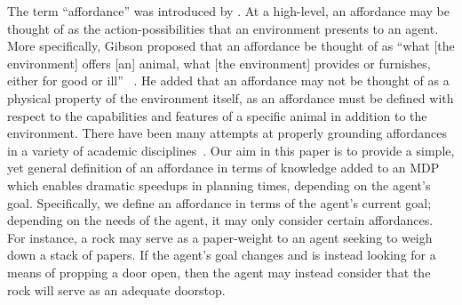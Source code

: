 \documentclass[]{article}
\begin{document}
The term ``affordance'' was introduced by \citet{gibson77}. At a
high-level, an affordance may be thought of as the
action-possibilities that an environment presents to an agent. More
specifically, Gibson proposed that an affordance be thought of as
``what [the environment] offers [an] animal, what [the environment]
provides or furnishes, either for good or ill'' ~\citep{gibson77}. He
added that an affordance may not be thought of as a physical property
of the environment itself, as an affordance must be defined with
respect to the capabilities and features of a specific animal in
addition to the environment.  There have been many attempts at
properly grounding affordances in a variety of academic
disciplines~\citep{koppula13a,harston03,koppula13b,gorniak06,kaschak00}. 
Our aim in this paper is to provide a simple, yet general definition of an
affordance in terms of knowledge added to an MDP which enables
dramatic speedups in planning times, depending on the agent's goal.
Specifically, we define an affordance in terms of the agent's current
goal; depending on the needs of the agent, it may only consider
certain affordances. For instance, a rock may serve as a
paper-weight to an agent seeking to weigh down a stack of papers. If
the agent's goal changes and is instead looking for a means of
propping a door open, then the agent may instead consider that the rock
will serve as an adequate doorstop.



\end{document}

